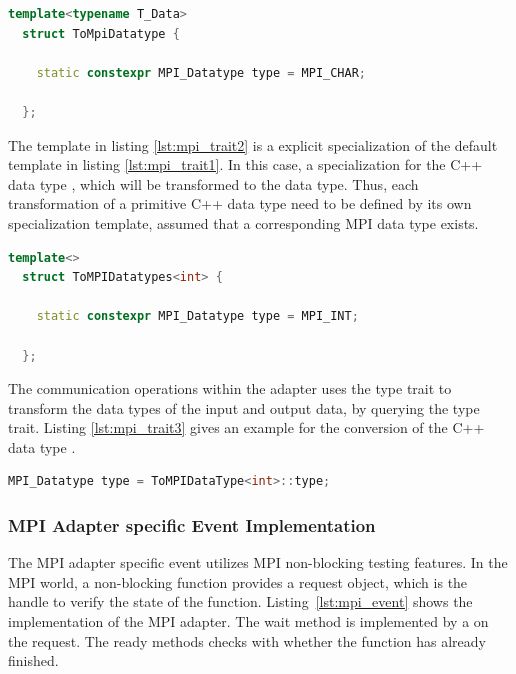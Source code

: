 \begin{lstlisting}[language=C++, label=lst:mpi_trait1]
  template<typename T_Data> 
  struct ToMpiDatatype { 

    static constexpr MPI_Datatype type = MPI_CHAR; 

  };
\end{lstlisting}

\noindent The template in listing \ref{lst:mpi_trait2} is a explicit
specialization of the default template in listing
\ref{lst:mpi_trait1}. In this case, a specialization for the C++ data
type , which will be transformed to the  data type.  Thus,
each transformation of a primitive C++ data type need to be defined
by its own specialization template, assumed that a corresponding
MPI data type exists.

\begin{lstlisting}[language=C++, label=lst:mpi_trait2]
  template<>
  struct ToMPIDatatypes<int> { 

    static constexpr MPI_Datatype type = MPI_INT; 

  };
\end{lstlisting}

The communication operations within the adapter uses the type trait to
transform the data types of the input and output data, by querying the
type trait. Listing \ref{lst:mpi_trait3} gives an example for the conversion 
of the C++ data type .

\begin{lstlisting}[language=C++, label=lst:mpi_trait3]
  MPI_Datatype type = ToMPIDataType<int>::type;
\end{lstlisting}

\subsubsection{MPI Adapter specific Event Implementation}
The MPI adapter specific event utilizes MPI non-blocking testing
features. In the MPI world, a non-blocking function provides a request
object, which is the handle to verify the state of the
function. Listing~\ref{lst:mpi_event} shows the 
implementation of the MPI adapter.  The wait method is implemented by
a  on the request. The ready methods checks with
 whether the function has already finished.


